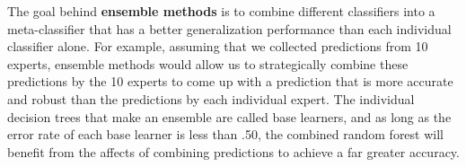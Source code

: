 \documentclass[a4paper,11pt]{article}
\begin{document}



The goal behind \textbf{ensemble methods} is to combine different classifiers into a meta-classifier that has a better generalization performance than each individual classifier alone. For example, assuming that we collected predictions from 10 experts, ensemble methods would allow us to strategically combine these predictions by the 10 experts to come up with a prediction that is more accurate and robust than the predictions by each individual expert. The individual decision trees that make an ensemble are called base learners, and as long as the error rate of each base learner is less than .50, the combined random forest will benefit from the affects of combining predictions to achieve a far greater accuracy.
\end{document}
